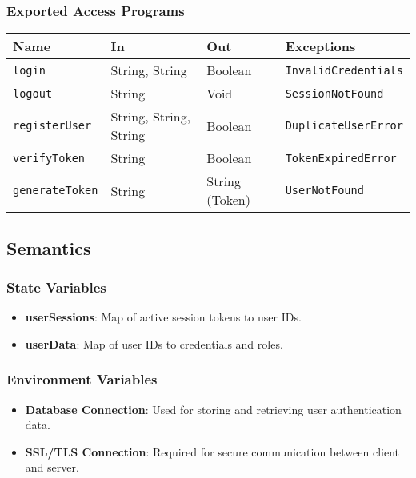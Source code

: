 \documentclass[12pt, titlepage]{article}
\begin{document}
\subsubsection{Exported Access Programs}

\begin{center}
\begin{tabular}{|p{3cm} | p{4cm} | p{4cm} | p{4cm}|}
\hline
\textbf{Name} & \textbf{In} & \textbf{Out} & \textbf{Exceptions} \\
\hline
\texttt{login} & String, String & Boolean & \texttt{InvalidCredentials} \\
\texttt{logout} & String & Void & \texttt{SessionNotFound} \\
\texttt{registerUser} & String, String, String & Boolean & \texttt{DuplicateUserError} \\
\texttt{verifyToken} & String & Boolean & \texttt{TokenExpiredError} \\
\texttt{generateToken} & String & String (Token) & \texttt{UserNotFound} \\
\hline
\end{tabular}
\end{center}

\subsection{Semantics}

\subsubsection{State Variables}

\begin{itemize}
    \item \textbf{userSessions}: Map of active session tokens to user IDs.
    \item \textbf{userData}: Map of user IDs to credentials and roles.
\end{itemize}

\subsubsection{Environment Variables}

\begin{itemize}
    \item \textbf{Database Connection}: Used for storing and retrieving user authentication data.
    \item \textbf{SSL/TLS Connection}: Required for secure communication between client and server.
\end{itemize}
\end{document}
